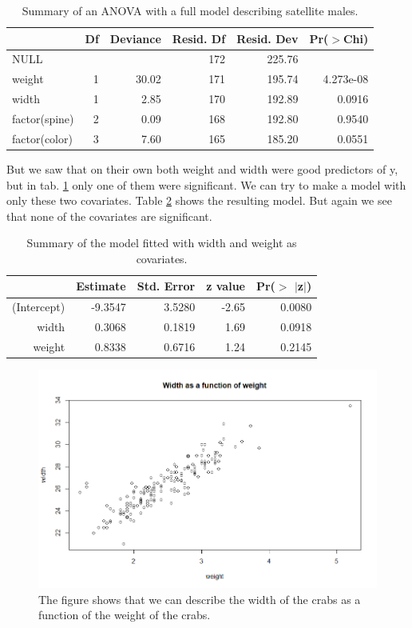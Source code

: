 \documentclass[a4paper,norsk, 10pt]{article}
\begin{document}
\begin{table}[!htb]
\centering
\begin{tabular}{lrrrrr}
  \hline
 & Df & Deviance & Resid. Df & Resid. Dev & Pr($>$Chi) \\ 
  \hline
NULL &  &  & 172 & 225.76 &  \\ 
  weight & 1 & 30.02 & 171 & 195.74 & 4.273e-08 \\ 
  width & 1 & 2.85 & 170 & 192.89 & 0.0916 \\ 
  factor(spine) & 2 & 0.09 & 168 & 192.80 & 0.9540 \\ 
  factor(color) & 3 & 7.60 & 165 & 185.20 & 0.0551 \\ 
   \hline
\end{tabular}
\caption{Summary of an ANOVA with a full model describing satellite males.}\label{tab:crabs_anova}
\end{table}




But we saw that on their own both weight and width were good predictors of y, but in tab. \ref{tab:crabs_anova} only one of them were significant. We can try to make a model with only these two covariates. Table \ref{tab:crabs_width_weight} shows the resulting model. But again we see that none of the covariates are significant. 

\begin{table}[!htb]
\centering
\begin{tabular}{rrrrr}
  \hline
 & Estimate & Std. Error & z value & Pr($>$ $|$z$|$) \\ 
  \hline
(Intercept) & -9.3547 & 3.5280 & -2.65 & 0.0080 \\ 
  width & 0.3068 & 0.1819 & 1.69 & 0.0918 \\ 
  weight & 0.8338 & 0.6716 & 1.24 & 0.2145 \\ 
   \hline
\end{tabular}
\caption{Summary of the model fitted with width and weight as covariates.}\label{tab:crabs_width_weight}
\end{table}

\begin{figure}[!htb]
\centering
\includegraphics[scale=0.5]{crabs_width_weight}
\caption{The figure shows that we can describe the width of the crabs as a function of the weight of the crabs.}\label{fig:crabs_width_weight}
\end{figure}
\end{document}
